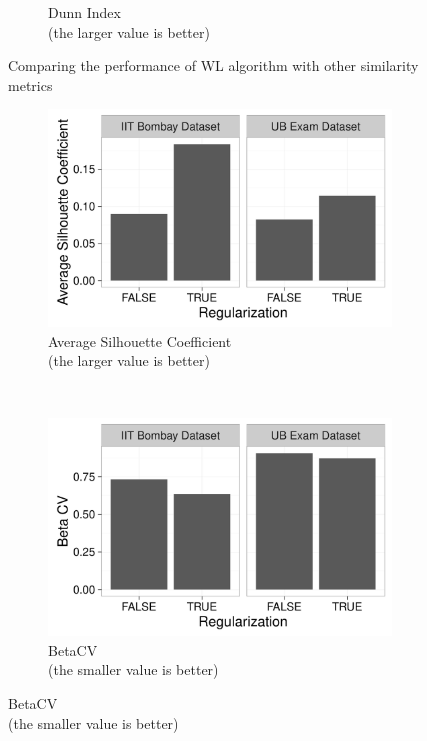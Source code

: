 \begin{figure}[h!]
\begin{subfigure}[b]{0.3\textwidth}
        \caption{Dunn Index\\(the larger value is better)}
    \end{subfigure}
    \caption{Comparing the performance of WL algorithm with other similarity metrics}
    \label{fig:comparison3}
\end{figure}

\begin{figure}[h!]
	\captionsetup[subfigure]{justification=centering}
    \centering
    \begin{subfigure}[b]{0.3\textwidth}
        \centering
        \includegraphics[width=\textwidth]{graphics/silhouette4}
        \caption{Average Silhouette Coefficient\\(the larger value is better)}
    \end{subfigure}%
    ~
    \begin{subfigure}[b]{0.3\textwidth}
        \centering
        \includegraphics[width=\textwidth]{graphics/beta_cv4}
        \caption{BetaCV\\(the smaller value is better)}

\end{subfigure}
\end{figure}
